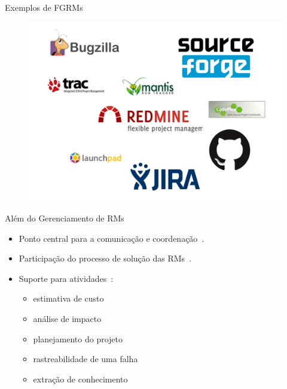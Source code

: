 \documentclass[t,14pt,mathserif]{beamer}
\begin{document}
\begin{frame}{Exemplos de FGRMs}
		\begin{figure}[hbtp]
			\centering
			\includegraphics[scale=.3]{../img/issue-tracking-sytem.png}
		\end{figure}
\end{frame}

\begin{frame}{Além do Gerenciamento de RMs}
	\begin{itemize}
        \item Ponto central para a comunicação e
              coordenação~\cite{Bertram:2010:CCB:1718918.1718972}.
        \item Participação do processo de solução das
              RMs~\cite{Breu:2010:INB:1718918.1718973}.
        \item Suporte para atividades~\cite{cavalcanti2013bug}:
            \begin{itemize}
                \item estimativa de custo
                \item análise de impacto
                \item planejamento do projeto
                \item rastreabilidade de uma falha
                \item extração de conhecimento
            \end{itemize}
      \end{itemize}
\end{frame}
\end{document}
